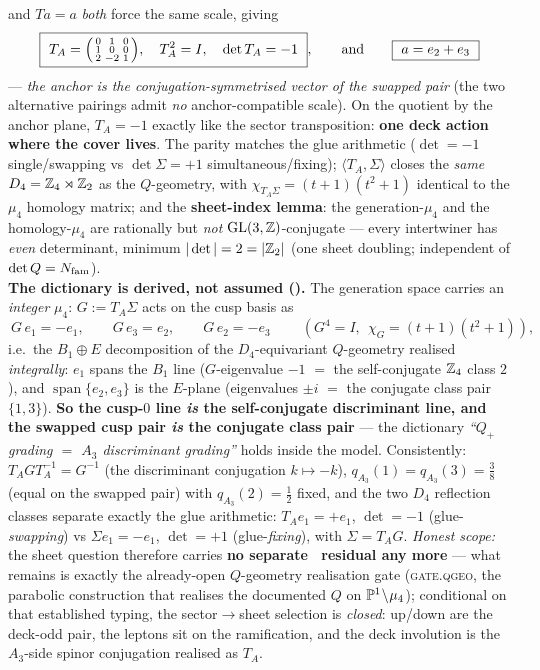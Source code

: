 \begin{keybox}
and $Ta=a$ \emph{both} force the same scale, giving
\[
  \boxed{\ T_A=\begin{psmallmatrix}0&1&0\\1&0&0\\2&-2&1\end{psmallmatrix},\quad T_A^2=I,\quad\det T_A=-1\ },
  \qquad\text{and}\qquad \boxed{\ a=e_2+e_3\ }
\]
--- \emph{the anchor is the conjugation-symmetrised vector of the swapped pair} (the two alternative
pairings admit \emph{no} anchor-compatible scale). On the quotient by the anchor plane, $T_A=-1$ exactly
like the sector transposition: \textbf{one deck action where the cover lives}. The parity matches the glue
arithmetic ($\det=-1$ single/swapping vs $\det\Sigma=+1$ simultaneous/fixing); $\langle T_A,\Sigma\rangle$
closes the \emph{same} $D_4=\mathbb{Z}_4\rtimes\mathbb{Z}_2$ as the $Q$-geometry, with $\chi_{T_A\Sigma}=(t{+}1)(t^2{+}1)$
identical to the $\mu_4$ homology matrix; and the \textbf{sheet-index lemma}: the generation-$\mu_4$ and the
homology-$\mu_4$ are rationally but \emph{not} $\mathrm{GL}(3,\mathbb{Z})$-conjugate --- every intertwiner has
\emph{even} determinant, minimum $|\det|=2=|\mathbb{Z}_2|$ (one sheet doubling; independent of $\det Q=N_{\mathrm{fam}}$).
\smallskip\\
\noindent\textbf{The dictionary is derived, not assumed ().}
The generation space carries an \emph{integer} $\mu_4$: $G:=T_A\Sigma$ acts on the cusp basis as
\[
  \boxed{\ G\,e_1=-e_1,\qquad G\,e_3=e_2,\qquad G\,e_2=-e_3\ }\qquad
  (G^4=I,\ \ \chi_G=(t{+}1)(t^2{+}1)),
\]
i.e.\ the $B_1\!\oplus\!E$ decomposition of the $D_4$-equivariant $Q$-geometry realised \emph{integrally}:
$e_1$ spans the $B_1$ line ($G$-eigenvalue $-1$ $=$ the self-conjugate $\mathbb{Z}_4$ class $2$), and
$\operatorname{span}\{e_2,e_3\}$ is the $E$-plane (eigenvalues $\pm i$ $=$ the conjugate class pair
$\{1,3\}$). \textbf{So the cusp-$0$ line \emph{is} the self-conjugate discriminant line, and the swapped
cusp pair \emph{is} the conjugate class pair} --- the dictionary \emph{``$Q_+$ grading $=$ $A_3$
discriminant grading''} holds inside the model. Consistently: $T_A G T_A^{-1}=G^{-1}$ (the discriminant
conjugation $k\mapsto-k$), $q_{A_3}(1)=q_{A_3}(3)=\tfrac38$ (equal on the swapped pair) with
$q_{A_3}(2)=\tfrac12$ fixed, and the two $D_4$ reflection classes separate exactly the glue arithmetic:
$T_Ae_1=+e_1$, $\det=-1$ (glue-\emph{swapping}) vs $\Sigma e_1=-e_1$, $\det=+1$ (glue-\emph{fixing}),
with $\Sigma=T_AG$. \emph{Honest scope:} the sheet question therefore carries \textbf{no separate \mC\
residual any more} --- what remains is exactly the already-open $Q$-geometry realisation gate
(\textsc{gate.qgeo}, the parabolic construction that realises the documented $Q$ on
$\mathbb{P}^1\!\setminus\!\mu_4$); conditional on that established typing, the sector$\to$sheet selection is
\emph{closed}: up/down are the deck-odd pair, the leptons sit on the ramification, and the deck involution
is the $A_3$-side spinor conjugation realised as $T_A$.
\end{keybox}

